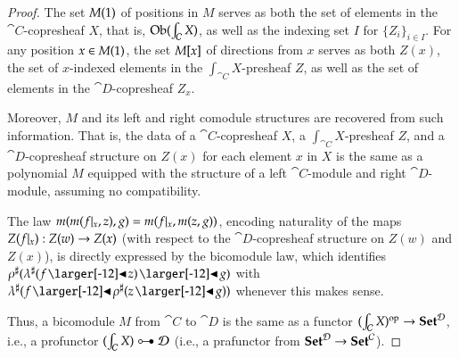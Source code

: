 \documentclass{amsart}
\begin{document}
\begin{proof}
  The set $M(1)$ of positions in $M$ serves as both the set of
  elements in the $\cat{C}$-copresheaf $X$, that is,
  $\operatorname{Ob}(\int_{\mathcal{C}}X)$, as well as the indexing set $I$ for
  $\{Z_i\}_{i \in I}$. For any position $x \in M(1)$, the set
  $M[x]$ of directions from $x$ serves as both $Z(x)$, the set of
  $x$-indexed elements in the $\int_{\cat{C}}X$-presheaf $Z$, as well
  as the set of elements in the $\cat{D}$-copresheaf $Z_x$.

  Moreover, $M$ and its left and right comodule structures are recovered
  from such information. That is, the data of a $\cat{C}$-copresheaf
  $X$, a $\int_{\cat{C}}X$-presheaf $Z$, and a $\cat{D}$-copresheaf
  structure on $Z(x)$ for each element $x$ in $X$ is the same as a
  polynomial $M$ equipped with the structure of a left
  $\cat{C}$-module and right $\cat{D}$-module, assuming no
  compatibility.

  The law $m(m(f|_{x}, z), g) = m(f|_{x}, m(z, g))$, encoding naturality
  of the maps $Z(f|_{x}): Z(w) \to Z(x)$ (with respect to the
  $\cat{D}$-copresheaf structure on $Z(w)$ and $Z(x)$), is directly
  expressed by the bicomodule law, which identifies
  $\anydirmapof{\rho}{\anydirmapof{\lambda}{f \subd z} \subd g}$ with
  $\anydirmapof{\lambda}{f \subd \anydirmapof{\rho}{z \subd g}}$ whenever
  this makes sense.

  Thus, a bicomodule $M$ from $\cat{C}$ to $\cat{D}$ is the same as a
  functor $(\int_{\mathcal{C}} X)^{\mathrm{op}} \to {\normalfont\mathbf{Set}}^{\mathcal{D}}$, i.e., a profunctor
  $(\int_{\cat{C}} X) \prof \cat{D}$ (i.e., a prafunctor from
  ${\normalfont\mathbf{Set}}^{\mathcal{D}} \to {\normalfont\mathbf{Set}}^{\mathcal{C}}$).
\end{proof}
\end{document}
